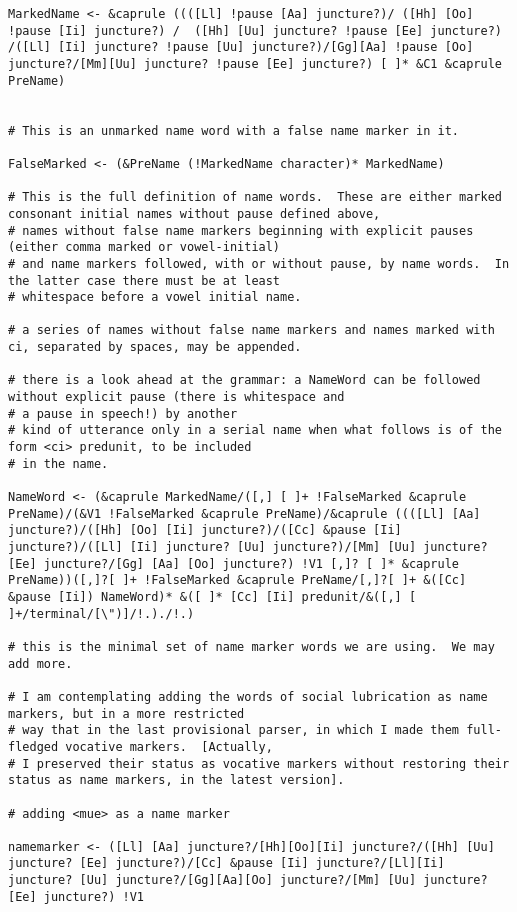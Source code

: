 \documentclass[12pt]{book}
\begin{document}
{\begin{verbatim}
MarkedName <- &caprule ((([Ll] !pause [Aa] juncture?)/ ([Hh] [Oo] !pause [Ii] juncture?) /  ([Hh] [Uu] juncture? !pause [Ee] juncture?) /([Ll] [Ii] juncture? !pause [Uu] juncture?)/[Gg][Aa] !pause [Oo] juncture?/[Mm][Uu] juncture? !pause [Ee] juncture?) [ ]* &C1 &caprule PreName)


# This is an unmarked name word with a false name marker in it.

FalseMarked <- (&PreName (!MarkedName character)* MarkedName)

# This is the full definition of name words.  These are either marked consonant initial names without pause defined above,
# names without false name markers beginning with explicit pauses (either comma marked or vowel-initial) 
# and name markers followed, with or without pause, by name words.  In the latter case there must be at least
# whitespace before a vowel initial name.

# a series of names without false name markers and names marked with ci, separated by spaces, may be appended.

# there is a look ahead at the grammar: a NameWord can be followed without explicit pause (there is whitespace and 
# a pause in speech!) by another
# kind of utterance only in a serial name when what follows is of the form <ci> predunit, to be included
# in the name.

NameWord <- (&caprule MarkedName/([,] [ ]+ !FalseMarked &caprule PreName)/(&V1 !FalseMarked &caprule PreName)/&caprule ((([Ll] [Aa] juncture?)/([Hh] [Oo] [Ii] juncture?)/([Cc] &pause [Ii] juncture?)/([Ll] [Ii] juncture? [Uu] juncture?)/[Mm] [Uu] juncture? [Ee] juncture?/[Gg] [Aa] [Oo] juncture?) !V1 [,]? [ ]* &caprule PreName))([,]?[ ]+ !FalseMarked &caprule PreName/[,]?[ ]+ &([Cc] &pause [Ii]) NameWord)* &([ ]* [Cc] [Ii] predunit/&([,] [ ]+/terminal/[\")]/!.)./!.)

# this is the minimal set of name marker words we are using.  We may add more.

# I am contemplating adding the words of social lubrication as name markers, but in a more restricted
# way that in the last provisional parser, in which I made them full-fledged vocative markers.  [Actually,
# I preserved their status as vocative markers without restoring their status as name markers, in the latest version].

# adding <mue> as a name marker

namemarker <- ([Ll] [Aa] juncture?/[Hh][Oo][Ii] juncture?/([Hh] [Uu] juncture? [Ee] juncture?)/[Cc] &pause [Ii] juncture?/[Ll][Ii] juncture? [Uu] juncture?/[Gg][Aa][Oo] juncture?/[Mm] [Uu] juncture? [Ee] juncture?) !V1


\end{verbatim}}
\end{document}
